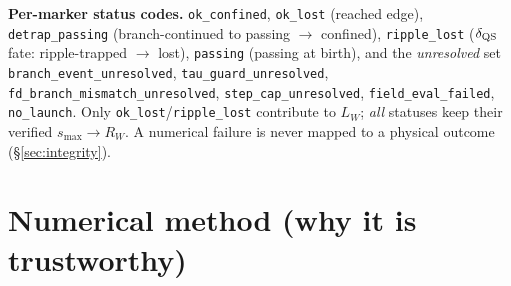 \documentclass[11pt]{article}
\newcommand{\code}[1]{\texttt{#1}}
\begin{document}
\textbf{Per-marker status codes.} \code{ok\_confined}, \code{ok\_lost} (reached edge),
\code{detrap\_passing} (branch-continued to passing $\to$ confined), \code{ripple\_lost}
($\delta_{\rm QS}$ fate: ripple-trapped $\to$ lost), \code{passing} (passing at birth), and the
\emph{unresolved} set \code{branch\_event\_unresolved}, \code{tau\_guard\_unresolved},
\code{fd\_branch\_mismatch\_unresolved}, \code{step\_cap\_unresolved}, \code{field\_eval\_failed},
\code{no\_launch}. Only \code{ok\_lost}/\code{ripple\_lost} contribute to $L_W$; \emph{all}
statuses keep their verified $s_{\max}\to R_W$. A numerical failure is never mapped to a physical
outcome (\S\ref{sec:integrity}).

\section{Numerical method (why it is trustworthy)}
\label{sec:num}
\end{document}
